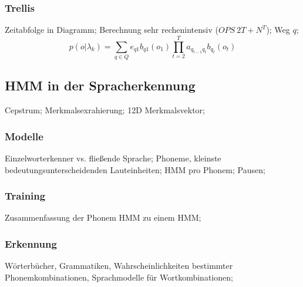 \documentclass[german,color,6pt]{latex4ei/latex4ei_sheet}
\begin{document}
\begin{sectionbox}
\subsubsection{Trellis}
Zeitabfolge in Diagramm; Berechnung sehr rechenintensiv ($OPS ~ 2T + N^T$); Weg $q$; 
\begin{equation*}
p(o | \lambda_k) = \sum\limits_{q \in Q} e_{q1} b_{q1} (o_1) \prod\limits^T _{t=2} a_{q_{t-1} q_t} b_{q_t} (o_t)
\end{equation*}
\end{sectionbox}

\subsection{HMM in der Spracherkennung}

\begin{symbolbox}
Cepstrum;  Merkmalsexrahierung; 12D Merkmalsvektor;
\end{symbolbox}

\begin{sectionbox}
\subsubsection{Modelle}
Einzelworterkenner vs. fließende Sprache; Phoneme, kleinste bedeutungsunterscheidenden Lauteinheiten; HMM pro Phonem; Pausen; 
\end{sectionbox}

\begin{sectionbox}
\subsubsection{Training}
Zusammenfassung der Phonem HMM zu einem HMM; 
\end{sectionbox}

\begin{sectionbox}
\subsubsection{Erkennung}
Wörterbücher, Grammatiken, Wahrscheinlichkeiten bestimmter Phonemkombinationen, Sprachmodelle für Wortkombinationen; 
\end{sectionbox}
\end{document}
